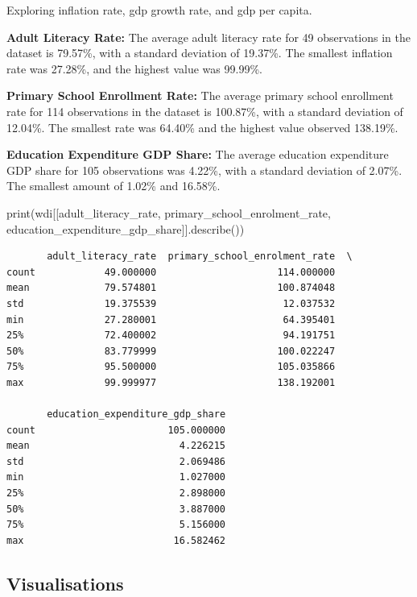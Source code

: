 \documentclass[
  letterpaper,
  DIV=11,
  numbers=noendperiod]{scrartcl}
\newenvironment{Shaded}{\begin{snugshade}}{\end{snugshade}}
\newcommand{\BuiltInTok}[1]{\textcolor[rgb]{0.00,0.23,0.31}{#1}}
\newcommand{\NormalTok}[1]{\textcolor[rgb]{0.00,0.23,0.31}{#1}}
\newcommand{\StringTok}[1]{\textcolor[rgb]{0.13,0.47,0.30}{#1}}
\begin{document}
Exploring inflation rate, gdp growth rate, and gdp per capita.

\textbf{Adult Literacy Rate:} The average adult literacy rate for 49
observations in the dataset is 79.57\%, with a standard deviation of
19.37\%. The smallest inflation rate was 27.28\%, and the highest value
was 99.99\%.

\textbf{Primary School Enrollment Rate:} The average primary school
enrollment rate for 114 observations in the dataset is 100.87\%, with a
standard deviation of 12.04\%. The smallest rate was 64.40\% and the
highest value observed 138.19\%.

\textbf{Education Expenditure GDP Share:} The average education
expenditure GDP share for 105 observations was 4.22\%, with a standard
deviation of 2.07\%. The smallest amount of 1.02\% and 16.58\%.

\begin{Shaded}
\begin{Highlighting}[]
\BuiltInTok{print}\NormalTok{(wdi[[}\StringTok{\textquotesingle{}adult\_literacy\_rate\textquotesingle{}}\NormalTok{, }\StringTok{\textquotesingle{}primary\_school\_enrolment\_rate\textquotesingle{}}\NormalTok{, }\StringTok{\textquotesingle{}education\_expenditure\_gdp\_share\textquotesingle{}}\NormalTok{]].describe())}
\end{Highlighting}
\end{Shaded}

\begin{verbatim}
       adult_literacy_rate  primary_school_enrolment_rate  \
count            49.000000                     114.000000   
mean             79.574801                     100.874048   
std              19.375539                      12.037532   
min              27.280001                      64.395401   
25%              72.400002                      94.191751   
50%              83.779999                     100.022247   
75%              95.500000                     105.035866   
max              99.999977                     138.192001   

       education_expenditure_gdp_share  
count                       105.000000  
mean                          4.226215  
std                           2.069486  
min                           1.027000  
25%                           2.898000  
50%                           3.887000  
75%                           5.156000  
max                          16.582462  
\end{verbatim}

\subsection{Visualisations}\label{visualisations}
\end{document}

